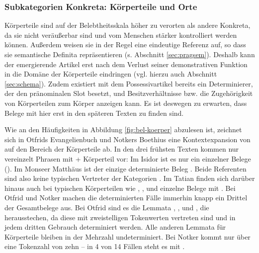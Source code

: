 \subsubsection{Subkategorien Konkreta: Körperteile und Orte}

Körperteile sind auf der Belebtheitsskala höher zu verorten als andere Konkreta, da sie nicht veräußerbar sind und vom Menschen stärker kontrolliert werden können. Außerdem weisen sie in der Regel eine eindeutige Referenz auf, so dass sie semantische Definita repräsentieren (s.  Abschnitt \ref{sec:pragsem}). Deshalb kann der emergierende Artikel erst nach dem Verlust seiner demonstrativen Funktion in die Domäne der Körperteile eindringen (vgl. hierzu auch Abschnitt \ref{sec:schema}). Zudem existiert mit dem Possessivartikel bereits ein Determinierer, der den pränominalen Slot besetzt, und Besitzverhältnisse bzw. die Zugehörigkeit von Körperteilen zum Körper anzeigen kann. Es ist deswegen zu erwarten, dass Belege mit  hier erst in den späteren Texten zu finden sind. 

Wie an den Häufigkeiten in Abbildung \ref{fig:bel-koerper} abzulesen ist, zeichnet sich in Otfrids Evangelienbuch und Notkers Boethius eine  Kontextexpansion von  auf den Bereich der Körperteile ab. 
In den drei frühsten Texten kommen nur vereinzelt Phrasen mit  + Körperteil vor: Im Isidor ist es nur ein einzelner Belege (). Im Monseer Matthäus ist der einzige determinierte Beleg . Beide Referenten sind also keine typischen Vertreter der Kategorien . Im Tatian finden sich darüber hinaus auch bei typischen Körperteilen wie , ,   und  einzelne Belege mit . Bei Otfrid und Notker machen die determinierten Fälle immerhin knapp ein Drittel der Gesamtbelege aus. Bei Otfrid sind es die Lemmata ,  ,   und , die herausstechen, da diese mit zweistelligen Tokenwerten vertreten sind und in jedem dritten Gebrauch determiniert werden. Alle anderen Lemmata für Körperteile bleiben in der Mehrzahl undeterminiert. Bei Notker kommt nur  über eine Tokenzahl von zehn -- in 4 von 14 Fällen steht es mit .


